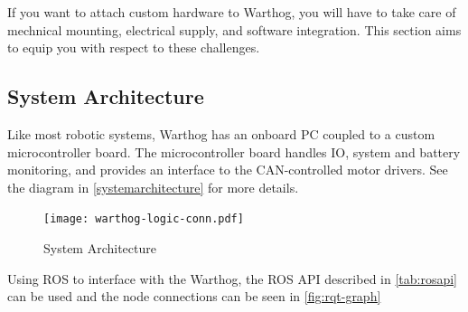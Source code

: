 \documentclass[]{clearpath-latex/clearpath-manual}
\begin{document}
If you want to attach custom hardware to Warthog, you will have to take care of mechnical mounting, electrical supply, and software integration.  This section aims to equip you with respect to these challenges.

\subsection{System Architecture}

Like most robotic systems, Warthog has an onboard PC coupled to a custom microcontroller board. The microcontroller board handles IO, system and battery monitoring, and provides an interface to the CAN-controlled motor drivers. See the diagram in \autoref{systemarchitecture} for more details.

\begin{figure}[!htb]
  \centering
  \texttt{[image: warthog-logic-conn.pdf]}
  \caption{System Architecture}
  \label{systemarchitecture}
\end{figure}

Using ROS to interface with the Warthog, the ROS API described in \autoref{tab:rosapi} can be used and the node connections can be seen in \autoref{fig:rqt-graph}
\end{document}

